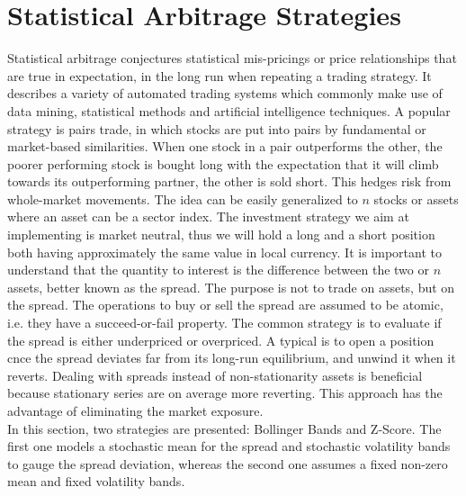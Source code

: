 \documentclass[11pt,a4,twosided,singlespacing,titlepagenumber=on]{scrreprt}
\numberwithin{equation}{chapter} %
\theoremstyle{remark}
\begin{document}
\chapter{Statistical Arbitrage Strategies}
Statistical arbitrage conjectures statistical mis-pricings or price relationships that are true in expectation, in the long run when repeating a trading strategy. It describes a variety of automated trading systems which commonly make use of data mining, statistical methods and artificial intelligence techniques. A popular strategy is pairs trade, in which stocks are put into pairs by fundamental or market-based similarities. When one stock in a pair outperforms the other, the poorer performing stock is bought long with the expectation that it will climb towards its outperforming partner, the other is sold short. This hedges risk from whole-market movements. The idea can be easily generalized to $n$ stocks or assets where an asset can be a sector index. The investment strategy we aim at implementing is market neutral, thus we will hold a long and a short position both having approximately the same value in local currency. It is important to understand that the quantity to interest is the difference between the two or $n$ assets, better known as the spread. The purpose is not to trade on assets, but on the spread. The operations to buy or sell the spread are assumed to be atomic, i.e. they have a succeed-or-fail property. The common strategy is to evaluate if the spread is either underpriced or overpriced. A typical is to open a position cnce the spread deviates far from its long-run equilibrium, and unwind it when it reverts. Dealing with spreads instead of non-stationarity assets is beneficial because stationary series are on average more reverting. This approach has the advantage of eliminating the market exposure. \\ 
In this section, two strategies are presented: Bollinger Bands and Z-Score. The first one models a stochastic mean for the spread and stochastic volatility bands to gauge the spread deviation, whereas the second one assumes a fixed non-zero mean and fixed volatility bands.
\end{document}
